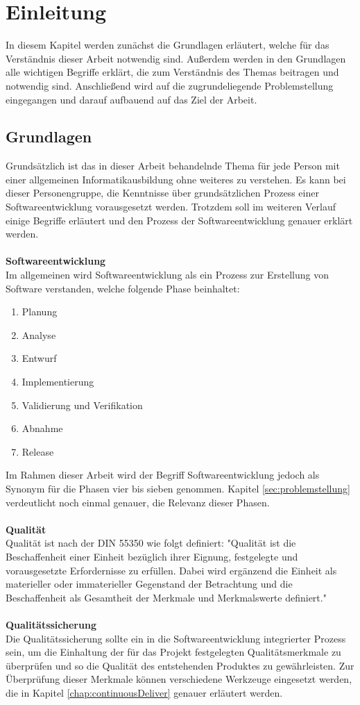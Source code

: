 \chapter{Einleitung}
\label{chap:einleitung}
In diesem Kapitel werden zunächst die Grundlagen erläutert, welche für das Verständnis dieser Arbeit notwendig sind. Außerdem werden in den Grundlagen alle wichtigen Begriffe erklärt, die zum Verständnis des Themas beitragen und notwendig sind. Anschließend wird auf die zugrundeliegende Problemstellung eingegangen und darauf aufbauend auf das Ziel der Arbeit.

\section{Grundlagen}
\label{sec:grundlagen}
Grundsätzlich ist das in dieser Arbeit behandelnde Thema für jede Person mit einer allgemeinen Informatikausbildung ohne weiteres zu verstehen. Es kann bei dieser Personengruppe, die Kenntnisse über grundsätzlichen Prozess einer Softwareentwicklung vorausgesetzt werden. Trotzdem soll im weiteren Verlauf einige Begriffe erläutert und den Prozess der Softwareentwicklung genauer erklärt werden.
\\\\
\textbf{Softwareentwicklung}\\
Im allgemeinen wird Softwareentwicklung als ein Prozess zur Erstellung von Software verstanden, welche folgende Phase beinhaltet:
\begin{enumerate}
	\item Planung
	\item Analyse
	\item Entwurf
	\item Implementierung
	\item Validierung und Verifikation
	\item Abnahme
	\item Release
\end{enumerate}
Im Rahmen dieser Arbeit wird der Begriff Softwareentwicklung jedoch als Synonym für die Phasen vier bis sieben genommen. Kapitel \ref{sec:problemstellung}  verdeutlicht noch einmal genauer, die Relevanz dieser Phasen.
\\\\
\textbf{Qualität}\\
Qualität ist nach der DIN 55350 wie folgt definiert: "Qualität ist die Beschaffenheit einer Einheit bezüglich ihrer Eignung, festgelegte und vorausgesetzte Erfordernisse zu erfüllen. Dabei wird ergänzend die Einheit als materieller oder immaterieller Gegenstand der Betrachtung und die Beschaffenheit als Gesamtheit der Merkmale und Merkmalswerte definiert."
\\\\
\textbf{Qualitätssicherung}\\
Die Qualitätssicherung sollte ein in die Softwareentwicklung integrierter Prozess sein, um die Einhaltung der für das Projekt festgelegten Qualitätsmerkmale zu überprüfen und so die Qualität des entstehenden Produktes zu gewährleisten. Zur Überprüfung dieser Merkmale können verschiedene Werkzeuge eingesetzt werden, die in Kapitel \ref{chap:continuousDeliver}  genauer erläutert werden.

